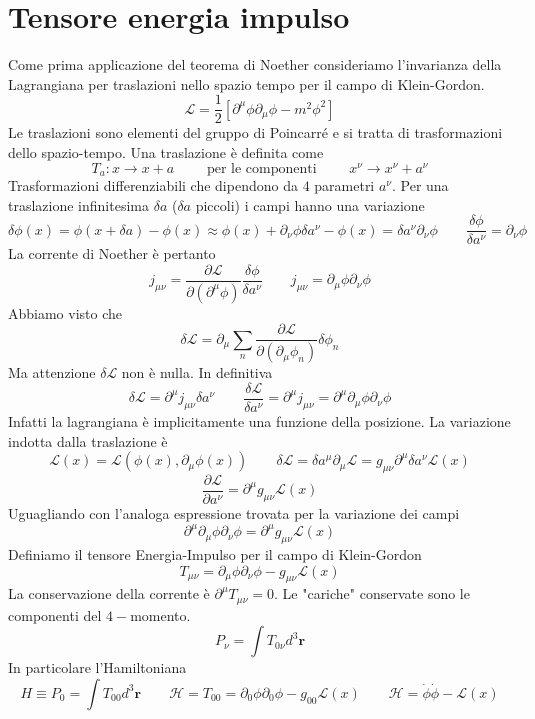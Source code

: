 \section{Tensore energia impulso}
Come prima applicazione del teorema di Noether consideriamo l'invarianza della Lagrangiana per traslazioni nello spazio tempo per il campo di Klein-Gordon.
$$
\mathcal{L} = \frac{1}{2}[\partial^\mu\phi\partial_\mu\phi - m^2\phi^2]
$$
Le traslazioni sono elementi del gruppo di Poincarré e si tratta di trasformazioni dello spazio-tempo. Una traslazione è definita come
$$
T_a : x \to x + a \qquad\text{ per le componenti }\qquad  x^\nu \to x^\nu + a^\nu
$$
Trasformazioni differenziabili che dipendono da $4$ parametri $a^\nu$. Per una traslazione infinitesima $\delta a$ ($\delta a$ piccoli) i campi hanno una variazione
$$
\delta\phi(x) = \phi(x+\delta a) - \phi(x) \approx \phi(x) + \partial_\nu\phi\delta a^\nu - \phi(x) = \delta a^\nu\partial_\nu\phi \qquad \frac{\delta\phi}{\delta a^\nu}=\partial_\nu\phi
$$
La corrente di Noether è pertanto
$$
j_{\mu\nu} = \frac{\partial\mathcal{L}}{\partial(\partial^\mu\phi)}\frac{\delta\phi}{\delta a^\nu} \qquad j_{\mu\nu} = \partial_\mu\phi\partial_\nu\phi
$$
Abbiamo visto che
$$
\delta\mathcal{L} = \partial_\mu \sum_n \frac{\partial\mathcal{L}}{\partial(\partial_\mu\phi_n)}\delta\phi_n
$$
Ma attenzione $\delta \mathcal{L}$ non è nulla. In definitiva
$$
\delta\mathcal{L} = \partial^\mu j_{\mu\nu}\delta a^\nu\qquad\frac{\delta\mathcal{L}}{\delta a^\nu} = \partial^\mu j_{\mu\nu} = \partial^\mu \partial_\mu\phi\partial_\nu\phi
$$
Infatti la lagrangiana è implicitamente una funzione della posizione. La variazione indotta dalla traslazione è
$$
\mathcal{L}(x) = \mathcal{L}(\phi(x), \partial_\mu\phi(x)) \qquad \delta\mathcal{L} = \delta a^\mu \partial_\mu \mathcal{L}=g_{\mu\nu}\partial^\mu\delta a^\nu\mathcal{L}(x)
$$
$$
\frac{\partial\mathcal{L}}{\partial a^\nu} = \partial^\mu g_{\mu\nu} \mathcal{L}(x)
$$
Uguagliando con l'analoga espressione trovata per la variazione dei campi 
$$
\partial^\mu \partial_\mu\phi\partial_\nu\phi = \partial^\mu g_{\mu\nu}\mathcal{L}(x)
$$
Definiamo il tensore Energia-Impulso per il campo di Klein-Gordon
$$
T_{\mu\nu} = \partial_\mu\phi\partial_\nu\phi - g_{\mu\nu}\mathcal{L}(x)
$$
La conservazione della corrente è $\partial^\mu T_{\mu\nu}=0$. Le "cariche" conservate sono le componenti del $4-$momento.
$$
P_\nu=\int T_{0\nu}d^3\mathbf{r}
$$
In particolare l'Hamiltoniana
$$
H \equiv P_0 = \int T_{00} d^3\mathbf{r} \qquad \mathcal{H} = T_{00} = \partial_0\phi\partial_0\phi - g_{00}\mathcal{L}(x) \qquad \mathcal{H} = \dot{\phi}\dot{\phi} - \mathcal{L}(x)
$$
